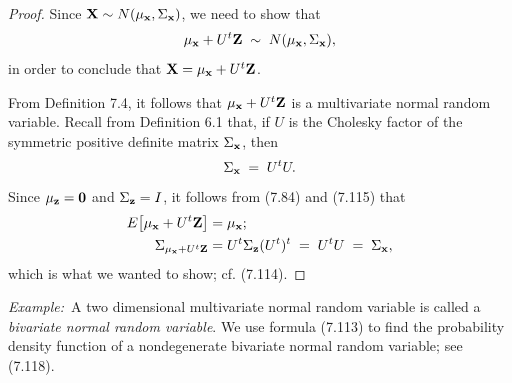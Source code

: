 
\begin{proof}
Since $\mathbf{X} \sim N(\mu_{\mathbf{x}},\Sigma_{\mathbf{x}})$, we need to show that
\begin{equation}
\mu_{\mathbf{x}} + U^t\mathbf{Z} \;\sim\; N(\mu_{\mathbf{x}},\Sigma_{\mathbf{x}}),
\end{equation}
in order to conclude that $\mathbf{X} = \mu_{\mathbf{x}} + U^t\mathbf{Z}$.

From Definition 7.4, it follows that $\mu_{\mathbf{x}} + U^t\mathbf{Z}$ is a multivariate normal random
variable. Recall from Definition 6.1 that, if $U$ is the Cholesky factor of the symmetric
positive definite matrix $\Sigma_{\mathbf{x}}$, then
\begin{equation}
\Sigma_{\mathbf{x}} \;=\; U^tU.
\end{equation}
Since $\mu_{\mathbf{z}}=\mathbf{0}$ and $\Sigma_{\mathbf{z}}=I$, it follows from (7.84) and (7.115) that
\begin{align*}
E\!\left[\mu_{\mathbf{x}}+U^t\mathbf{Z}\right] &= \mu_{\mathbf{x}}; \\
\Sigma_{\mu_{\mathbf{x}}+U^t\mathbf{Z}} &= U^t\Sigma_{\mathbf{z}}(U^t)^t \;=\; U^tU \;=\; \Sigma_{\mathbf{x}},
\end{align*}
which is what we wanted to show; cf. (7.114).
\end{proof}

\medskip
\noindent\textit{Example:}\ A two dimensional multivariate normal random variable is called a
\textit{bivariate normal random variable}. We use formula (7.113) to find the probability
density function of a nondegenerate bivariate normal random variable; see (7.118).

